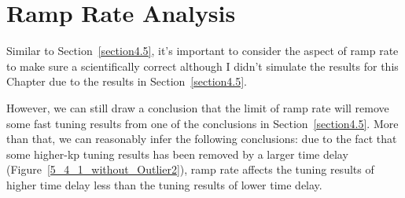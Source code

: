 \section{Ramp Rate Analysis} %
\label{section5.5}
Similar to Section~\ref{section4.5}, it's important to consider the aspect of ramp rate to make sure a scientifically correct although I didn't simulate the results for this Chapter due to the results in Section~\ref{section4.5}. 

However, we can still draw a conclusion that the limit of ramp rate will remove some fast tuning results from one of the conclusions in Section~\ref{section4.5}. More than that, we can reasonably infer the following conclusions: due to the fact that some higher-kp tuning results has been removed by a larger time delay (Figure~\ref{5_4_1_without_Outlier2}), ramp rate affects the tuning results of higher time delay less than the tuning results of lower time delay.